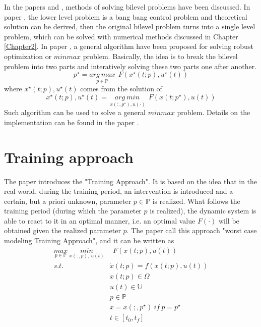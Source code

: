 \documentclass  [
  paper    = a4,
  BCOR     = 10mm,
  twoside,
  fontsize = 12pt,
  fleqn,
  toc      = bibnumbered,
  toc      = listofnumbered,
  numbers  = noendperiod,
  headings = normal,
  listof   = leveldown,
  version  = 3.03
]                                       {scrreprt}
\newcommand{\<}{\langle}
\renewcommand{\>}{\rangle}
\begin{document}
In the papers \cite{Mas14} and \cite{KM16}, methods of solving bilevel problems have been discussed. In paper \cite{KM16}, the lower level problem is a bang bang control problem and theoretical solution can be derived, then the original bilevel problem turns into a single level problem, which can be solved with numerical methods discussed in Chapter \ref{Chapter2}. In paper \cite{Mas14}, a general algorithm have been proposed for solving robust optimization or $minmax$ problem. Basically, the idea is to break the bilevel problem into two parts and interatively solving these two parts one after another. 
\begin{equation}
	   p^\star = \underset{p  \in   \mathbb{P} }{arg\ max}   \ \ F(x^\star(t;p), u^\star(t))
\end{equation}
where $x^\star(t;p), u^\star(t)$ comes from the solution of 
\begin{equation}
	x^\star(t;p), u^\star(t) = \underset{\ x(:,p^\star), u(\cdot)}{arg\ min}   \ \ F(x(t;p^\star), u(t))
\end{equation}
Such algorithm can be used to solve a general $minmax$ problem. Details on the implementation can be found in the paper \cite{Mas14}.


\section{Training approach}
The paper \cite{MatSch22} introduces the "Training Approach".  It is based on the idea that in the real world, during the training period, an intervention is introduced and a certain, but a priori unknown, parameter $p  \in   \mathbb{P}$ is realized. What follows the training period (during which the parameter $p$ is realized), the dynamic system is able to react to it in an optimal manner, i.e. an optimal value $ F(\cdot)$ will be obtained given the  realized parameter $p$. The paper \cite{MatSch22} call this approach "worst case modeling Training Approach", and it can be written as 
\begin{equation}
	\begin{aligned}
		\underset{p  \in   \mathbb{P}}{max} \ \underset{x(:,p), \  u(t)}{min} &  \ \ F(x(t;p), u(t))\\ 
	s.t.\ \  &  \dot{x} (t;p) = f(x(t;p), u(t))\\ 
& x(t;p) \in \Omega \\
& u(t) \in \mathbb{U}  \\
& p  \in   \mathbb{P}  \\
& x = x(;,p^\star) \ if \ p = p^\star \\
& t \in [t_0, t_f]
	\end{aligned}
	\label{maxmin}
\end{equation}
\end{document}
